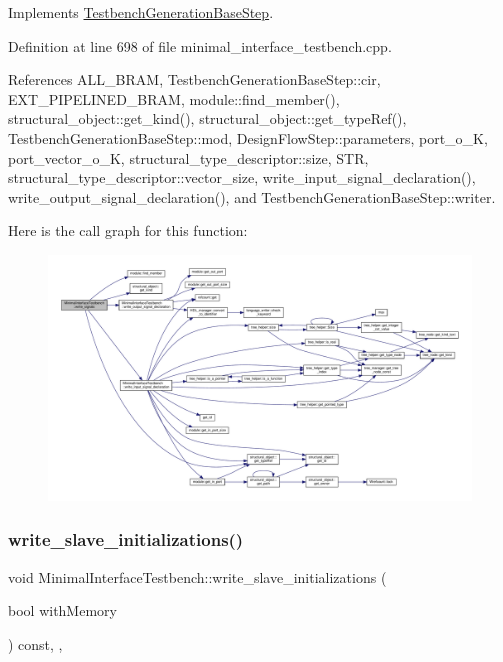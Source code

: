 Implements \hyperlink{classTestbenchGenerationBaseStep_af4bf6836e809359aa23a892ea16c08df}{Testbench\+Generation\+Base\+Step}.



Definition at line 698 of file minimal\+\_\+interface\+\_\+testbench.\+cpp.



References A\+L\+L\+\_\+\+B\+R\+AM, Testbench\+Generation\+Base\+Step\+::cir, E\+X\+T\+\_\+\+P\+I\+P\+E\+L\+I\+N\+E\+D\+\_\+\+B\+R\+AM, module\+::find\+\_\+member(), structural\+\_\+object\+::get\+\_\+kind(), structural\+\_\+object\+::get\+\_\+type\+Ref(), Testbench\+Generation\+Base\+Step\+::mod, Design\+Flow\+Step\+::parameters, port\+\_\+o\+\_\+K, port\+\_\+vector\+\_\+o\+\_\+K, structural\+\_\+type\+\_\+descriptor\+::size, S\+TR, structural\+\_\+type\+\_\+descriptor\+::vector\+\_\+size, write\+\_\+input\+\_\+signal\+\_\+declaration(), write\+\_\+output\+\_\+signal\+\_\+declaration(), and Testbench\+Generation\+Base\+Step\+::writer.

Here is the call graph for this function\+:
\nopagebreak
\begin{figure}[H]
\begin{center}
\leavevmode
\includegraphics[width=350pt]{d0/dba/classMinimalInterfaceTestbench_ae769d22c64fd7d99cbfb435881cc0fc0_cgraph}
\end{center}
\end{figure}
\mbox{\label{classMinimalInterfaceTestbench_a1bf1863909ba155e241745c78f6e3c03}} 
\subsubsection{\texorpdfstring{write\+\_\+slave\+\_\+initializations()}{write\_slave\_initializations()}}
{\footnotesize\ttfamily void Minimal\+Interface\+Testbench\+::write\+\_\+slave\+\_\+initializations (\begin{DoxyParamCaption}\item[{bool}]{with\+Memory }\end{DoxyParamCaption}) const\hspace{0.3cm}{\ttfamily [override]}, {\ttfamily [protected]}, {\ttfamily [virtual]}}

